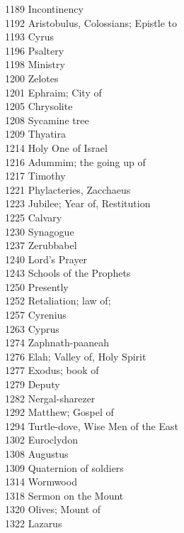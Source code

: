 1189 \quad Incontinency\\
1192 \quad Aristobulus, Colossians; Epistle to\\
1193 \quad Cyrus\\
1196 \quad Psaltery\\
1198 \quad Ministry\\
1200 \quad Zelotes\\
1201 \quad Ephraim; City of\\
1205 \quad Chrysolite\\
1208 \quad Sycamine tree\\
1209 \quad Thyatira\\
1214 \quad Holy One of Israel\\
1216 \quad Adummim; the going up of\\
1217 \quad Timothy\\
1221 \quad Phylacteries, Zacchaeus\\
1223 \quad Jubilee; Year of, Restitution\\
1225 \quad Calvary\\
1230 \quad Synagogue\\
1237 \quad Zerubbabel\\
1240 \quad Lord’s Prayer\\
1243 \quad Schools of the Prophets\\
1250 \quad Presently\\
1252 \quad Retaliation; law of;\\
1257 \quad Cyrenius\\
1263 \quad Cyprus\\
1274 \quad Zaphnath-paaneah\\
1276 \quad Elah; Valley of, Holy Spirit\\
1277 \quad Exodus; book of\\
1279 \quad Deputy\\
1282 \quad Nergal-sharezer\\
1292 \quad Matthew; Gospel of\\
1294 \quad Turtle-dove, Wise Men of the East\\
1302 \quad Euroclydon\\
1308 \quad Augustus\\
1309 \quad Quaternion of soldiers\\
1314 \quad Wormwood\\
1318 \quad Sermon on the Mount\\
1320 \quad Olives; Mount of\\
1322 \quad Lazarus\\

